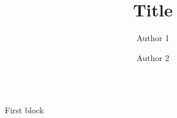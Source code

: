 \documentclass[english,xcolor=table,t
]{beamer}
\title{Title}
\author{Author 1 \and Author 2}
\institute{institute name}
\begin{document}
\begin{frame}

\begin{columns}


\begin{block}{First block}

\end{block}


\end{columns}

\end{frame}
\end{document}
